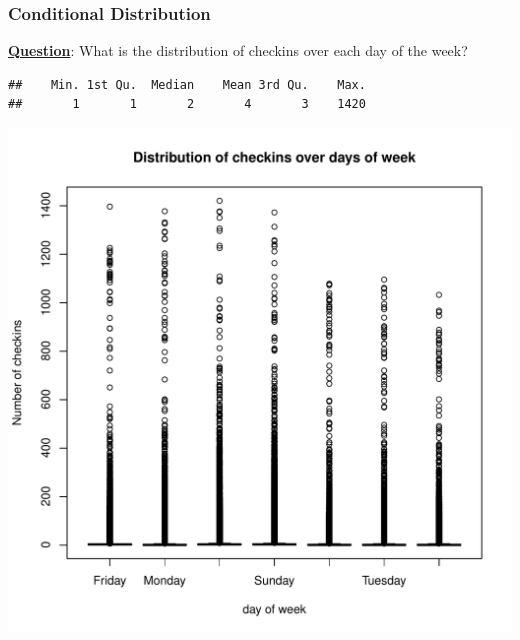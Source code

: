 \documentclass[12pt]{book}\usepackage{knitr}
\begin{document}
\subsubsection{Conditional Distribution}
\noindent \textbf{\underline{Question}}: What is the distribution of checkins over each day of the week?
\begin{knitrout}
\color{fgcolor}\begin{kframe}
\begin{alltt}
\hlopt{$}
\end{alltt}
\begin{verbatim}
##    Min. 1st Qu.  Median    Mean 3rd Qu.    Max. 
##       1       1       2       4       3    1420
\end{verbatim}
\begin{alltt}
\hlopt{$} \hlopt{~} \hlopt{$}
         \hlstd{=} \hlstd{,}
         \hlstd{=} \hlstd{,} \hlstd{=} \hlstd{)}
\end{alltt}
\end{kframe}
\includegraphics[width=\maxwidth]{figure/checkinsOverWeek-1} 
\begin{kframe}\begin{alltt}
\end{alltt}
\end{kframe}
\end{knitrout}
\end{document}
